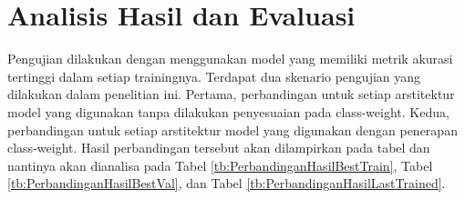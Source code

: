 \section{Analisis Hasil dan Evaluasi}
\label{sec:42}

Pengujian dilakukan dengan menggunakan model yang memiliki metrik akurasi tertinggi dalam setiap trainingnya. Terdapat dua skenario pengujian yang dilakukan dalam penelitian ini. Pertama, perbandingan untuk setiap arstitektur model yang digunakan tanpa dilakukan penyesuaian pada class-weight. Kedua, perbandingan untuk setiap arstitektur model yang digunakan dengan penerapan class-weight. Hasil perbandingan tersebut akan dilampirkan pada tabel dan nantinya akan dianalisa pada Tabel \ref{tb:PerbandinganHasilBestTrain}, Tabel \ref{tb:PerbandinganHasilBestVal}, dan Tabel \ref{tb:PerbandinganHasilLastTrained}.

